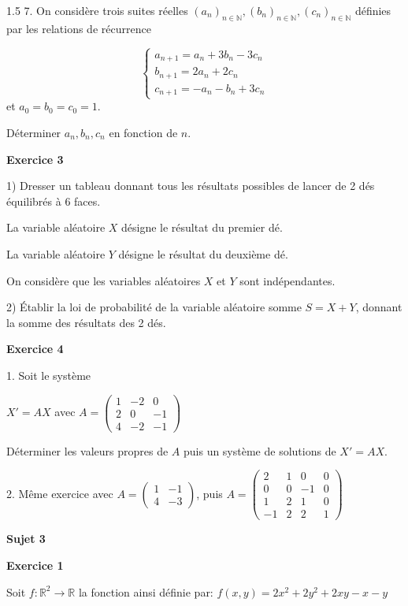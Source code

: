 \documentclass[12pt]{article}
\begin{document}
\begin{spacing}{1.5}
 7. On considère trois suites réelles $(a_n)_{n\in \mathbb{N}},(b_n)_{n\in \mathbb{N}},(c_n)_{n\in \mathbb{N}}$ définies par les relations de récurrence
 
\[
\begin{cases}
a_{n+1} = a_n+3b_n-3c_n\\
b_{n+1} = 2a_n+2c_n\\
c_{n+1} = -a_n-b_n+3c_n
\end{cases}
\]
et $a_0=b_0=c_0=1$.

Déterminer $a_n,b_n,c_n$ en fonction de $n$.
 

\medskip\textbf{Exercice 3}
 
  1) Dresser un tableau donnant tous les résultats possibles de lancer de 2 dés équilibrés à 6 faces.
 
 La variable aléatoire $X$ désigne le résultat du premier dé.
 
 La variable aléatoire $Y$ désigne le résultat du deuxième dé.
 
 On considère que les variables aléatoires $X$ et $Y$ sont indépendantes.
 
 2) Établir la loi de probabilité de la variable aléatoire somme $S=X+Y$, donnant la somme des résultats des 2 dés.
 
 \medskip\textbf{Exercice 4}
 
 1. Soit le système 
 
 $X'=AX$ avec $A=\begin{pmatrix}
 1 & -2 & 0 \\ 
 2 & 0 & -1 \\ 
 4 & -2 & -1
 \end{pmatrix} $
 
 Déterminer les valeurs propres de $A$ puis un système de solutions de $X'=AX$.
 
 2. Même exercice avec
 $A=\begin{pmatrix}
 1 & -1 \\ 
 4 & -3
 \end{pmatrix} $, puis $A=\begin{pmatrix}
 2 & 1 & 0 & 0 \\ 
 0 & 0 & -1 & 0 \\ 
 1 & 2 & 1 & 0 \\ 
 -1 & 2 & 2 & 1
 \end{pmatrix} $
 
 
 \quad
 
 \medskip\textbf{Sujet 3}
 
 \textbf{Exercice 1 }
 
  Soit $f :\mathbb{R}^2\longrightarrow \mathbb{R}$ la fonction ainsi définie par:
 $f(x,y)=2x^2+2y^2+2xy-x-y$
 

\end{spacing}
\end{document}
